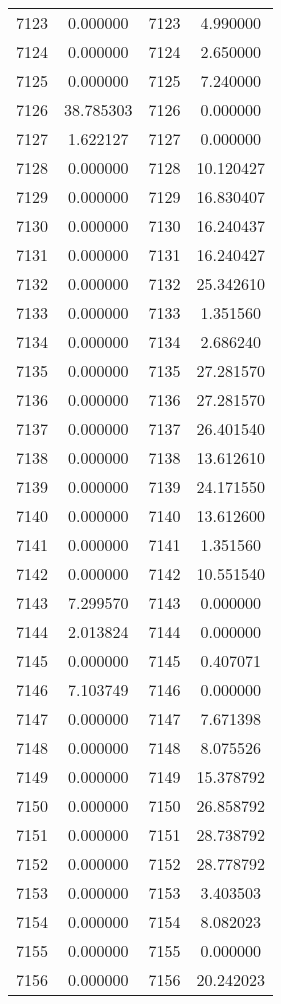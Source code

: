 \documentclass[12pt]{article}
\begin{document}
\begin{longtable}{@{}cccc@{}}
7123 & 0.000000 & 7123 & 4.990000 \\
7124 & 0.000000 & 7124 & 2.650000 \\
7125 & 0.000000 & 7125 & 7.240000 \\
7126 & 38.785303 & 7126 & 0.000000 \\
7127 & 1.622127 & 7127 & 0.000000 \\
7128 & 0.000000 & 7128 & 10.120427 \\
7129 & 0.000000 & 7129 & 16.830407 \\
7130 & 0.000000 & 7130 & 16.240437 \\
7131 & 0.000000 & 7131 & 16.240427 \\
7132 & 0.000000 & 7132 & 25.342610 \\
7133 & 0.000000 & 7133 & 1.351560 \\
7134 & 0.000000 & 7134 & 2.686240 \\
7135 & 0.000000 & 7135 & 27.281570 \\
7136 & 0.000000 & 7136 & 27.281570 \\
7137 & 0.000000 & 7137 & 26.401540 \\
7138 & 0.000000 & 7138 & 13.612610 \\
7139 & 0.000000 & 7139 & 24.171550 \\
7140 & 0.000000 & 7140 & 13.612600 \\
7141 & 0.000000 & 7141 & 1.351560 \\
7142 & 0.000000 & 7142 & 10.551540 \\
7143 & 7.299570 & 7143 & 0.000000 \\
7144 & 2.013824 & 7144 & 0.000000 \\
7145 & 0.000000 & 7145 & 0.407071 \\
7146 & 7.103749 & 7146 & 0.000000 \\
7147 & 0.000000 & 7147 & 7.671398 \\
7148 & 0.000000 & 7148 & 8.075526 \\
7149 & 0.000000 & 7149 & 15.378792 \\
7150 & 0.000000 & 7150 & 26.858792 \\
7151 & 0.000000 & 7151 & 28.738792 \\
7152 & 0.000000 & 7152 & 28.778792 \\
7153 & 0.000000 & 7153 & 3.403503 \\
7154 & 0.000000 & 7154 & 8.082023 \\
7155 & 0.000000 & 7155 & 0.000000 \\
7156 & 0.000000 & 7156 & 20.242023 \\

\end{longtable}
\end{document}
